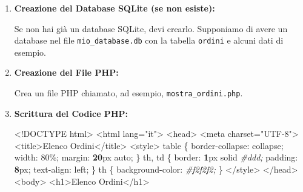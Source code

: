 \documentclass[italian,a4paper]{article}
\newenvironment{Shaded}{}{}
\newcommand{\CommentTok}[1]{\textcolor[rgb]{0.38,0.63,0.69}{\textit{#1}}}
\newcommand{\ConstantTok}[1]{\textcolor[rgb]{0.53,0.00,0.00}{#1}}
\newcommand{\DecValTok}[1]{\textcolor[rgb]{0.25,0.63,0.44}{#1}}
\newcommand{\ErrorTok}[1]{\textcolor[rgb]{1.00,0.00,0.00}{\textbf{#1}}}
\newcommand{\NormalTok}[1]{#1}
\newcommand{\OperatorTok}[1]{\textcolor[rgb]{0.40,0.40,0.40}{#1}}
\newcommand{\OtherTok}[1]{\textcolor[rgb]{0.00,0.44,0.13}{#1}}
\newcommand{\StringTok}[1]{\textcolor[rgb]{0.25,0.44,0.63}{#1}}
\begin{document}
\begin{enumerate}
\def\labelenumi{\arabic{enumi}.}
\item
  \textbf{Creazione del Database SQLite (se non esiste):}

  Se non hai già un database SQLite, devi crearlo. Supponiamo di avere
  un database nel file \texttt{mio\_database.db} con la tabella
  \texttt{ordini} e alcuni dati di esempio.
\item
  \textbf{Creazione del File PHP:}

  Crea un file PHP chiamato, ad esempio, \texttt{mostra\_ordini.php}.
\item
  \textbf{Scrittura del Codice PHP:}

\begin{Shaded}
\begin{Highlighting}[]
\OperatorTok{\textless{}!}\ConstantTok{DOCTYPE}\NormalTok{ html}\OperatorTok{\textgreater{}}
\OperatorTok{\textless{}}\NormalTok{html lang}\OperatorTok{=}\StringTok{"it"}\OperatorTok{\textgreater{}}
\OperatorTok{\textless{}}\NormalTok{head}\OperatorTok{\textgreater{}}
    \OperatorTok{\textless{}}\NormalTok{meta charset}\OperatorTok{=}\StringTok{"UTF{-}8"}\OperatorTok{\textgreater{}}
    \OperatorTok{\textless{}}\NormalTok{title}\OperatorTok{\textgreater{}}\NormalTok{Elenco Ordini}\OperatorTok{\textless{}/}\NormalTok{title}\OperatorTok{\textgreater{}}
    \OperatorTok{\textless{}}\NormalTok{style}\OperatorTok{\textgreater{}}
\NormalTok{        table \{}
\NormalTok{            border}\OperatorTok{{-}}\NormalTok{collapse}\OtherTok{:}\NormalTok{ collapse}\OtherTok{;}
\NormalTok{            width}\OtherTok{:} \DecValTok{80}\OperatorTok{\%}\OtherTok{;}
\NormalTok{            margin}\OtherTok{:} \ErrorTok{20}\NormalTok{px auto}\OtherTok{;}
\NormalTok{        \}}
\NormalTok{        th}\OtherTok{,}\NormalTok{ td \{}
\NormalTok{            border}\OtherTok{:} \ErrorTok{1}\NormalTok{px solid }\CommentTok{\#ddd;}
\NormalTok{            padding}\OtherTok{:} \ErrorTok{8}\NormalTok{px}\OtherTok{;}
\NormalTok{            text}\OperatorTok{{-}}\NormalTok{align}\OtherTok{:}\NormalTok{ left}\OtherTok{;}
\NormalTok{        \}}
\NormalTok{        th \{}
\NormalTok{            background}\OperatorTok{{-}}\NormalTok{color}\OtherTok{:} \CommentTok{\#f2f2f2;}
\NormalTok{        \}}
    \OperatorTok{\textless{}/}\NormalTok{style}\OperatorTok{\textgreater{}}
\OperatorTok{\textless{}/}\NormalTok{head}\OperatorTok{\textgreater{}}
\OperatorTok{\textless{}}\NormalTok{body}\OperatorTok{\textgreater{}}
    \OperatorTok{\textless{}}\NormalTok{h1}\OperatorTok{\textgreater{}}\NormalTok{Elenco Ordini}\OperatorTok{\textless{}/}\NormalTok{h1}\OperatorTok{\textgreater{}}


\end{Highlighting}
\end{Shaded}
\end{enumerate}
\end{document}
